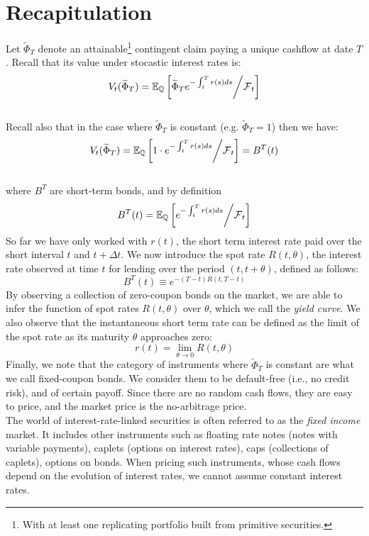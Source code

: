 \documentclass[11pt]{article}
\date{Lecture 4 (29 Jan. 2013)}
\begin{document}
{\small \maketitle}

\section{Recapitulation}

Let $\widetilde{\Phi}_T$ denote an attainable\footnote{With at least one replicating portfolio built from primitive securities.} contingent claim paying a unique cashflow at date $T$. Recall that its value under stocastic interest rates is:
$$ V_t(\widetilde{\Phi}_T) = \operatorname{\mathbb E}_{\operatorname{\mathbb Q}} \left[ \widetilde{\Phi}_T e^{-\int_t^T r(s) ds} \middle/ \operatorname{\mathcal F}_t \right]$$\\
Recall also that in the case where $\widetilde{\Phi}_T$ is constant (e.g. $\widetilde{\Phi}_T = 1$) then we have:
$$ V_t(\widetilde{\Phi}_T) = \operatorname{\mathbb E}_{\operatorname{\mathbb Q}} \left[ 1 \cdot e^{-\int_t^T r(s) ds} \middle/ \operatorname{\mathcal F}_t \right] = B^T(t)$$\\
where $B^T$ are short-term bonds, and by definition
$$B^T(t) = \operatorname{\mathbb E}_{\operatorname{\mathbb Q}} \left[ e^{-\int_t^T r(s) ds} \middle/ \operatorname{\mathcal F}_t \right]$$
So far we have only worked with $r(t)$, the short term interest rate paid over the short interval $t$ and $t+\Delta t$. We now introduce the spot rate $R(t, \theta)$, the interest rate observed at time $t$ for lending over the period $(t, t+\theta)$, defined as follows:
$$B^T(t) \equiv e^{-(T-t)R(t,T-t)}$$
By observing a collection of zero-coupon bonds on the market, we are able to infer the function of spot rates $R(t, \theta)$ over $\theta$, which we call the {\em yield curve}.
We also observe that the instantaneous short term rate can be defined as the limit of the spot rate as its maturity $\theta$ approaches zero:
$$r(t) = \lim_{\theta \rightarrow 0} R(t, \theta)$$
Finally, we note that the category of instruments where $\widetilde{\Phi}_T$ is constant are what we call fixed-coupon bonds. We consider them to be default-free (i.e., no credit risk), and of certain payoff. Since there are no random cash flows, they are easy to price, and the market price is the no-arbitrage price. \\

The world of interest-rate-linked securities is often referred to as the {\em fixed income} market. It includes other instruments such as floating rate notes (notes with variable payments), caplets (options on interest rates), caps (collections of caplets), options on bonds. When pricing such instruments, whose cash flows depend on the evolution of interest rates, we cannot assume constant interest rates. \\
\end{document}
